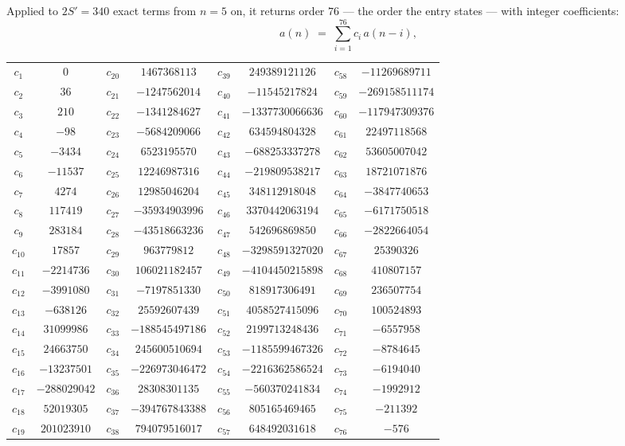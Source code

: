 \documentclass[11pt,a4paper]{article}
\theoremstyle{plain}
\theoremstyle{definition}
\begin{document}
Applied to $2S'=340$ exact terms from $n=5$ on, it returns order $76$ --- the
order the entry states --- with integer coefficients:
\[
a(n)\;=\;\sum_{i=1}^{76}c_i\,a(n-i),
\]
\begin{center}\small
\begin{tabular}{cccccccc}
$c_{1}$ & $0$ & $c_{20}$ & $1467368113$ & $c_{39}$ & $249389121126$ & $c_{58}$ & $-11269689711$ \\
$c_{2}$ & $36$ & $c_{21}$ & $-1247562014$ & $c_{40}$ & $-11545217824$ & $c_{59}$ & $-269158511174$ \\
$c_{3}$ & $210$ & $c_{22}$ & $-1341284627$ & $c_{41}$ & $-1337730066636$ & $c_{60}$ & $-117947309376$ \\
$c_{4}$ & $-98$ & $c_{23}$ & $-5684209066$ & $c_{42}$ & $634594804328$ & $c_{61}$ & $22497118568$ \\
$c_{5}$ & $-3434$ & $c_{24}$ & $6523195570$ & $c_{43}$ & $-688253337278$ & $c_{62}$ & $53605007042$ \\
$c_{6}$ & $-11537$ & $c_{25}$ & $12246987316$ & $c_{44}$ & $-219809538217$ & $c_{63}$ & $18721071876$ \\
$c_{7}$ & $4274$ & $c_{26}$ & $12985046204$ & $c_{45}$ & $348112918048$ & $c_{64}$ & $-3847740653$ \\
$c_{8}$ & $117419$ & $c_{27}$ & $-35934903996$ & $c_{46}$ & $3370442063194$ & $c_{65}$ & $-6171750518$ \\
$c_{9}$ & $283184$ & $c_{28}$ & $-43518663236$ & $c_{47}$ & $542696869850$ & $c_{66}$ & $-2822664054$ \\
$c_{10}$ & $17857$ & $c_{29}$ & $963779812$ & $c_{48}$ & $-3298591327020$ & $c_{67}$ & $25390326$ \\
$c_{11}$ & $-2214736$ & $c_{30}$ & $106021182457$ & $c_{49}$ & $-4104450215898$ & $c_{68}$ & $410807157$ \\
$c_{12}$ & $-3991080$ & $c_{31}$ & $-7197851330$ & $c_{50}$ & $818917306491$ & $c_{69}$ & $236507754$ \\
$c_{13}$ & $-638126$ & $c_{32}$ & $25592607439$ & $c_{51}$ & $4058527415096$ & $c_{70}$ & $100524893$ \\
$c_{14}$ & $31099986$ & $c_{33}$ & $-188545497186$ & $c_{52}$ & $2199713248436$ & $c_{71}$ & $-6557958$ \\
$c_{15}$ & $24663750$ & $c_{34}$ & $245600510694$ & $c_{53}$ & $-1185599467326$ & $c_{72}$ & $-8784645$ \\
$c_{16}$ & $-13237501$ & $c_{35}$ & $-226973046472$ & $c_{54}$ & $-2216362586524$ & $c_{73}$ & $-6194040$ \\
$c_{17}$ & $-288029042$ & $c_{36}$ & $28308301135$ & $c_{55}$ & $-560370241834$ & $c_{74}$ & $-1992912$ \\
$c_{18}$ & $52019305$ & $c_{37}$ & $-394767843388$ & $c_{56}$ & $805165469465$ & $c_{75}$ & $-211392$ \\
$c_{19}$ & $201023910$ & $c_{38}$ & $794079516017$ & $c_{57}$ & $648492031618$ & $c_{76}$ & $-576$ \\
\end{tabular}
\end{center}
\end{document}
